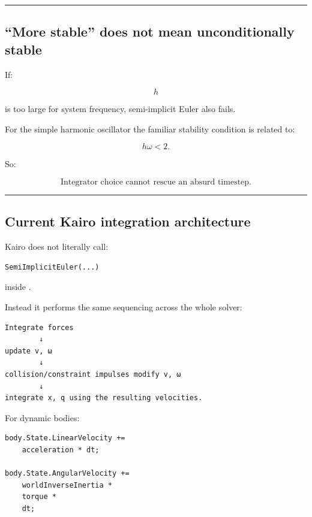\begin{center}\rule{0.5\linewidth}{0.5pt}\end{center}

\subsection{``More stable'' does not mean unconditionally stable}\label{06-engine-ii-ch037-more-stable-does-not-mean-unconditionally-stable}

\hypertarget{06-engine-ii-ch037-more-stable-does-not-mean-unconditionally-stable}{}

If:

\[
h
\]

is too large for system frequency, semi-implicit Euler also fails.

For the simple harmonic oscillator the familiar stability condition is related to:

\[
h\omega<2.
\]

So:

\[
\boxed{
\text{Integrator choice cannot rescue an absurd timestep.}
}
\]

\begin{center}\rule{0.5\linewidth}{0.5pt}\end{center}

\subsection{Current Kairo integration architecture}\label{06-engine-ii-ch037-current-kairo-integration-architecture}

\hypertarget{06-engine-ii-ch037-current-kairo-integration-architecture}{}

Kairo does not literally call:

\begin{verbatim}
SemiImplicitEuler(...)
\end{verbatim}

inside .

Instead it performs the same sequencing across the whole solver:

\begin{verbatim}
Integrate forces
        ↓
update v, ω
        ↓
collision/constraint impulses modify v, ω
        ↓
integrate x, q using the resulting velocities.
\end{verbatim}

For dynamic bodies:

\begin{verbatim}
body.State.LinearVelocity +=
    acceleration * dt;

body.State.AngularVelocity +=
    worldInverseInertia *
    torque *
    dt;
\end{verbatim}

